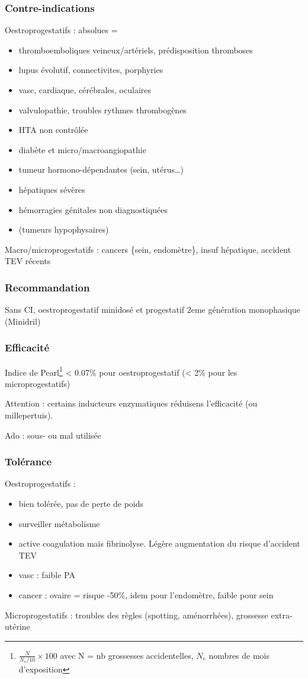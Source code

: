 \documentclass[11pt]{article}
\begin{document}
\subsubsection{Contre-indications}
\label{sec:org3330994}
Oestroprogestatifs : absolues =
\begin{itemize}
\item thromboemboliques veineux/artériels, prédisposition thromboses
\item lupus évolutif, connectivites, porphyries
\item vasc, cardiaque, cérébrales, oculaires
\item valvulopathie, troubles rythmes thrombogènes
\item HTA non contrôlée
\item diabète et micro/macroangiopathie
\item tumeur hormono-dépendantes (sein, utérus\ldots{})
\item hépatiques sévères
\item hémorragies génitales non diagnostiquées
\item (tumeurs hypophysaires)
\end{itemize}
Macro/microprogestatifs : cancers \{sein, endomètre\}, insuf hépatique, accident
TEV récents

\subsubsection{Recommandation}
\label{sec:org9f8a23a}
Sans CI, oestroprogestatif minidosé et progestatif 2eme génération monophasique
(Minidril)

\subsubsection{Efficacité}
\label{sec:orgcd6a53c}
Indice de Pearl\footnote{\(\frac{N}{N_e/10}\times 100\) avec N = nb grossesses
accidentelles, \(N_e\) nombres de mois d'exposition} < 0.07\% pour oestroprogestatif
(< 2\% pour les microprogestatifs)

Attention : certains inducteurs enzymatiques réduisens l'efficacité (ou
millepertuis).

Ado : sous- ou mal utilisée

\subsubsection{Tolérance}
\label{sec:org60ff919}
Oestroprogestatifs :
\begin{itemize}
\item bien tolérée, pas de perte de poids
\item surveiller métabolisme
\item active coagulation mais \inc fibrinolyse. Légère augmentation du risque
d'accident TEV
\item vasc : faible \inc PA
\item cancer : ovaire = risque -50\%, idem pour l'endomètre, faible \inc pour sein
\end{itemize}
Microprogestatifs : troubles des règles (spotting, aménorrhées), grossesse
extra-utérine
\end{document}
